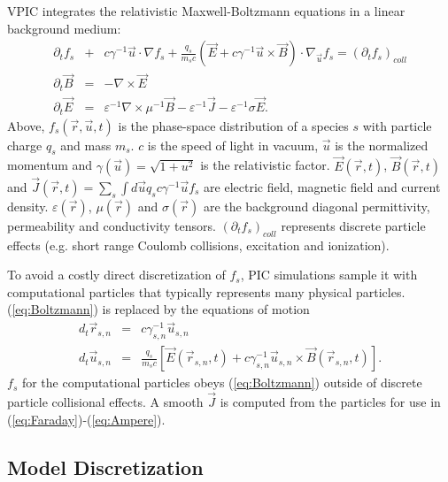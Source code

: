 \documentclass[letter,10pt]{article}
\newcommand{\eps}{\varepsilon}
\newcommand{\vecr}{\vec{r}}
\newcommand{\vecu}{\vec{u}}
\newcommand{\vecJ}{\vec{J}}
\newcommand{\vecE}{\vec{E}}
\newcommand{\vecB}{\vec{B}}
\newcommand{\Deriv}[2]{d_{#2}#1}
\newcommand{\PDeriv}[2]{\partial_{#2}#1}
\newcommand{\DotP}[2]{#1 \cdot #2}
\newcommand{\CrossP}[2]{#1 \times #2}
\newcommand{\Grad}[1]{\nabla #1}
\newcommand{\Curl}[1]{\nabla \times #1}
\newcommand{\Gradu}[1]{\nabla_{\vecu} #1}
\newcommand{\eq}[1]{(\ref{eq:#1})}
\begin{document}
VPIC integrates the relativistic Maxwell-Boltzmann equations in a
linear background medium:
\begin{eqnarray}
\PDeriv{f_s}{t} &+& 
\DotP{c\gamma^{-1}\vecu}{\Grad{f_s}} +
\DotP{\frac{q_s}{m_s c}\left(\vecE+\CrossP{c\gamma^{-1}\vecu}{\vecB}\right)}
{\Gradu{f_s}} = \left(\PDeriv{f_s}{t}\right)_{coll} \label{eq:Boltzmann}\\
\PDeriv{\vecB}{t} &=& -\Curl{\vecE} \label{eq:Faraday}\\
\PDeriv{\vecE}{t} &=&
\eps^{-1}\Curl{\mu^{-1}\vecB} - \eps^{-1}\vecJ - \eps^{-1}\sigma\vecE
\label{eq:Ampere}
.
\end{eqnarray}
Above, $f_s\left(\vecr,\vecu,t\right)$ is the phase-space distribution
of a species $s$ with particle charge $q_s$ and mass $m_s$.  $c$ is
the speed of light in vacuum, $\vecu$ is the normalized momentum and
$\gamma\left(\vecu\right) = \sqrt{1 + u^2}$ is the relativistic
factor.  $\vecE\left(\vecr,t\right)$, $\vecB\left(\vecr,t\right)$ and
$\vecJ\left(\vecr,t\right) = \sum_s \int d\vecu q_s c\gamma^{-1}\vecu
f_s$ are electric field, magnetic field and current density.
$\eps\left(\vecr\right)$, $\mu\left(\vecr\right)$ and
$\sigma\left(\vecr\right)$ are the background diagonal permittivity,
permeability and conductivity tensors.
$\left(\PDeriv{f_s}{t}\right)_{coll}$ represents discrete particle
effects (e.g. short range Coulomb collisions, excitation and
ionization).

To avoid a costly direct discretization of $f_s$, PIC simulations
sample it with computational particles that typically represents many
physical particles.  \eq{Boltzmann} is replaced by the equations of
motion
\begin{eqnarray}
\Deriv{\vecr_{s,n}}{t} &=& c \gamma_{s,n}^{-1} \vecu_{s,n} \label{eq:Position}\\
\Deriv{\vecu_{s,n}}{t} &=& \frac{q_s}{m_s c} \left[
\vecE\left(\vecr_{s,n},t\right) +
\CrossP{c\gamma_{s,n}^{-1}\vecu_{s,n}}{\vecB\left(\vecr_{s,n},t\right)}
\right] \label{eq:Momentum}
.
\end{eqnarray}
$f_s$ for the computational particles obeys \eq{Boltzmann} outside of
discrete particle collisional effects.  A smooth $\vecJ$ is computed
from the particles for use in \eq{Faraday}-\eq{Ampere}.

\subsection{Model Discretization}
\end{document}
